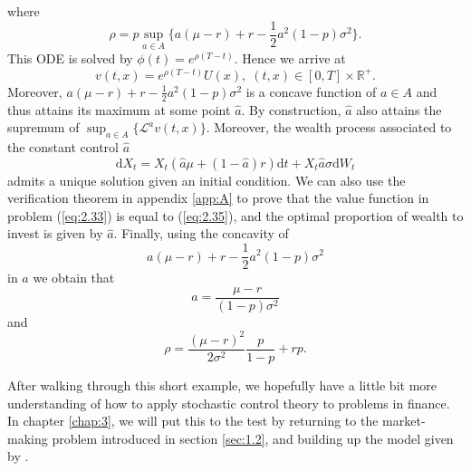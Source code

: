 where 
\begin{equation*}
    \rho=p\sup_{a\in A}\{a(\mu-r)+r-\frac{1}{2}a^2(1-p)\sigma^2\}.
\end{equation*}
This ODE is solved by $\phi(t)=e^{\rho(T-t)}$. Hence we arrive at 
\begin{equation}\label{eq:2.36}
    v(t,x)=e^{\rho(T-t)}U(x),\;(t,x)\in[0,T]\times\mathbb{R}^+.
\end{equation}
Moreover, $a(\mu-r)+r-\frac{1}{2}a^2(1-p)\sigma^2$ is a concave function of $a\in A$
and thus attains its maximum at some point $\hat a$. By construction, $\hat a$ also
attains the supremum of $\sup_{a\in A}\{\mathcal{L}^av(t,x)\}$. Moreover, the wealth
process associated to the constant control $\hat a$
\begin{equation*}
    \mathrm dX_t=X_t(\hat a\mu+(1-\hat a)r)\mathrm dt+X_t\hat a\sigma\mathrm dW_t
\end{equation*}
admits a unique solution given an initial condition. We can also use the verification 
theorem in appendix \ref{app:A} to prove that the value function in problem (\ref{eq:2.33})
is equal to (\ref{eq:2.35}), and the optimal proportion of wealth to invest is given 
by $\hat a$. Finally, using the concavity of 
\begin{equation*}
    a(\mu-r)+r-\frac{1}{2}a^2(1-p)\sigma^2
\end{equation*}
in $a$ we obtain that 
\begin{equation}
    \hat a=\frac{\mu-r}{(1-p)\sigma^2}
\end{equation}
and 
\begin{equation}
    \rho=\frac{(\mu-r)^2}{2\sigma^2}\frac{p}{1-p}+rp.
\end{equation}

After walking through this short example, we hopefully have a little bit more understanding
of how to apply stochastic control theory to problems in finance. In chapter \ref{chap:3},
we will put this to the test by returning to the market-making problem introduced in
section \ref{sec:1.2}, and building up the model given by \cite{AS2008}.
